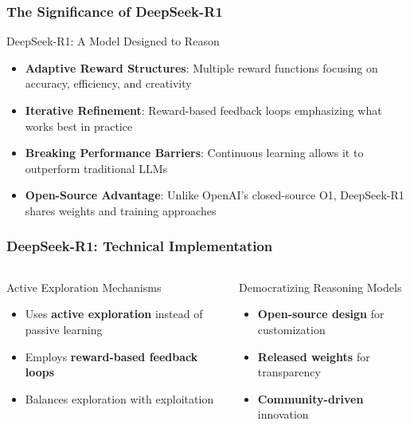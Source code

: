 \documentclass[aspectratio=169]{beamer}
\begin{document}
\begin{frame}
	\frametitle{The Significance of DeepSeek-R1}
	\begin{block}{DeepSeek-R1: A Model Designed to Reason}
		\begin{itemize}
			\item \textbf{Adaptive Reward Structures}: Multiple reward functions focusing on accuracy, efficiency, and creativity
			\item \textbf{Iterative Refinement}: Reward-based feedback loops emphasizing what works best in practice
			\item \textbf{Breaking Performance Barriers}: Continuous learning allows it to outperform traditional LLMs
			\item \textbf{Open-Source Advantage}: Unlike OpenAI's closed-source O1, DeepSeek-R1 shares weights and training approaches
		\end{itemize}
	\end{block}
\end{frame}

\begin{frame}[shrink=10]
	\frametitle{\textbf{DeepSeek-R1}: Technical Implementation}
	\begin{columns}[T]
		\begin{column}{0.48\textwidth}
			\begin{block}{Active Exploration Mechanisms}
				\begin{itemize}\setlength{\itemsep}{0em}
					\item Uses \textbf{active exploration} instead of passive learning
					\item Employs \textbf{reward-based feedback loops}
					\item Balances exploration with exploitation
				\end{itemize}
			\end{block}
		\end{column}
		\begin{column}{0.48\textwidth}
			\begin{block}{Democratizing Reasoning Models}
				\begin{itemize}\setlength{\itemsep}{0em}
					\item \textbf{Open-source design} for customization
					\item \textbf{Released weights} for transparency
					\item \textbf{Community-driven} innovation
				\end{itemize}
			\end{block}
		\end{column}
	\end{columns}
\end{frame}
\end{document}
